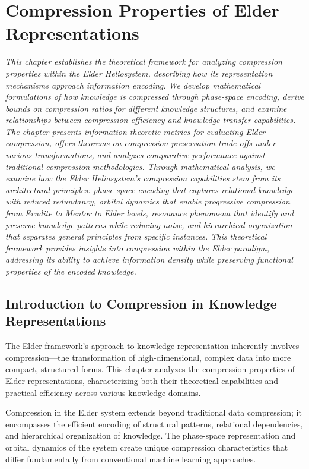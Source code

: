 \chapter{Compression Properties of Elder Representations}

\textit{This chapter establishes the theoretical framework for analyzing compression properties within the Elder Heliosystem, describing how its representation mechanisms approach information encoding. We develop mathematical formulations of how knowledge is compressed through phase-space encoding, derive bounds on compression ratios for different knowledge structures, and examine relationships between compression efficiency and knowledge transfer capabilities. The chapter presents information-theoretic metrics for evaluating Elder compression, offers theorems on compression-preservation trade-offs under various transformations, and analyzes comparative performance against traditional compression methodologies. Through mathematical analysis, we examine how the Elder Heliosystem's compression capabilities stem from its architectural principles: phase-space encoding that captures relational knowledge with reduced redundancy, orbital dynamics that enable progressive compression from Erudite to Mentor to Elder levels, resonance phenomena that identify and preserve knowledge patterns while reducing noise, and hierarchical organization that separates general principles from specific instances. This theoretical framework provides insights into compression within the Elder paradigm, addressing its ability to achieve information density while preserving functional properties of the encoded knowledge.}

\section{Introduction to Compression in Knowledge Representations}

The Elder framework's approach to knowledge representation inherently involves compression—the transformation of high-dimensional, complex data into more compact, structured forms. This chapter analyzes the compression properties of Elder representations, characterizing both their theoretical capabilities and practical efficiency across various knowledge domains.

Compression in the Elder system extends beyond traditional data compression; it encompasses the efficient encoding of structural patterns, relational dependencies, and hierarchical organization of knowledge. The phase-space representation and orbital dynamics of the system create unique compression characteristics that differ fundamentally from conventional machine learning approaches.

